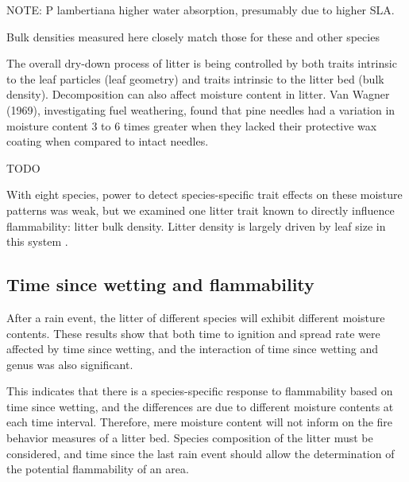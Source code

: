 \documentclass[fire,article,submit,moreauthors,pdftex]{Definitions/mdpi}
\begin{document}
NOTE: P lambertiana higher water absorption, presumably due to higher SLA.



Bulk densities measured here closely match those for these and other species \cite{van_Wagtendonk+Sydoriak+etal-1998,Stephens+Finney+etal-2004}

The overall dry-down process of litter is being controlled by both traits intrinsic to the leaf particles (leaf geometry) and traits intrinsic to the litter bed (bulk density). Decomposition can also affect moisture content in litter. Van Wagner (1969), investigating fuel weathering, found that pine needles had a variation in moisture content 3 to 6 times greater when they lacked their protective wax coating when compared to intact needles.


TODO

With eight species, power to detect species-specific trait effects on these moisture patterns was weak, but we examined one litter trait known to directly influence flammability: litter bulk density. Litter density is largely driven by leaf size in this system \cite{Magalhaes+Schwilk-2012}. 

\subsection{Time since wetting and flammability}

After a rain event, the litter of different species will exhibit different moisture contents. These results show that both time to ignition and spread rate were affected by time since wetting, and the interaction of time since wetting and genus was also significant.

This indicates that there is a species-specific response to flammability based on time since wetting, and the differences are due to different moisture contents at each time interval. Therefore, mere moisture content will not inform on the fire behavior measures of a litter bed. Species composition of the litter must be considered, and time since the last rain event should allow the determination of the potential flammability of an area. 
\end{document}
